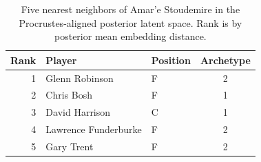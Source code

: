 \begin{table}[htbp]
  \centering\small
  \begin{tabular}{rllc}
    \toprule
    Rank & Player & Position & Archetype \\
    \midrule
    1 & Glenn Robinson & F & 2 \\
    2 & Chris Bosh & F & 1 \\
    3 & David Harrison & C & 1 \\
    4 & Lawrence Funderburke & F & 2 \\
    5 & Gary Trent & F & 2 \\
    \bottomrule
  \end{tabular}
  \caption{Five nearest neighbors of Amar'e Stoudemire in the Procrustes-aligned posterior latent space. Rank is by posterior mean embedding distance.}
  \label{tab:Amar_e_Stoudemire_neighbors}
\end{table}

